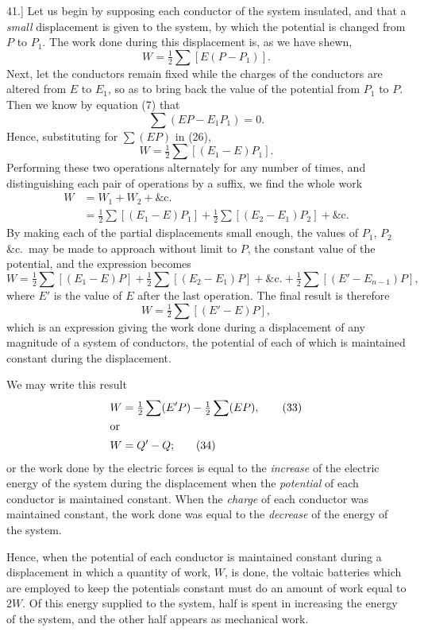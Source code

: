 \documentclass[12pt,oneside]{book}[2021/10/04]
\newcommand{\Runhead}[1]{\fancyhead[C]{\iffloatpage{}{\small#1}}}
\newcommand{\article}[1]{\phantomsection \label{art:#1}{#1.]}}
\newcommand{\¬}{\hphantom{0}}
\begin{document}
\article{41} Let us begin by supposing each conductor of the system
insulated, and that a \textit{small} displacement is given to the system, by
which the potential is changed from \(P\) to \(P_1\). The work done
during this displacement is, as we have shewn,
\[W = \tfrac{1}{2}\sum[E(P - P_1)]. \tag{26}\]
Next, let the conductors remain fixed while the charges of the conductors
are altered from \(E\) to \(E_1\), so as to bring back the value of
the potential from \(P_1\) to \(P\). Then we know by equation (7) that
\[\sum(EP - E_1P_1) = 0. \tag{27}\]
Hence, substituting for \(\sum(EP)\) in (26),
\[W = \tfrac{1}{2}\sum[(E_1 - E)P_1]. \tag{28}\]
Performing these two operations alternately for any number of
times, and distinguishing each pair of operations by a suffix, we
find the whole work
\begin{align}
W &= W_1 + W_2 + \text{\&c.} \tag{29}\\
&= \tfrac{1}{2}\sum[(E_1 - E)P_1] + \tfrac{1}{2}\sum[(E_2 - E_1)P_2] + \text{\&c.} \tag{30}
\end{align}
By making each of the partial displacements small enough, the
values of \(P_1\), \(P_2\) \&c.\ may be made to approach without limit to \(P\),
the constant value of the potential, and the expression becomes
\[W = \tfrac{1}{2}\sum[(E_1 - E)P] + \tfrac{1}{2}\sum[(E_2 - E_1)P] + \text{\&c.} + \tfrac{1}{2}\sum[(E' - E_{n-1})P], \tag{31}\]
where \(E'\) is the value of \(E\) after the last operation. The final result
is therefore
\[W = \tfrac{1}{2}\sum[(E' - E)P], \tag{32}\]
which is an expression giving the work done during a displacement
of any magnitude of a system of conductors, the potential of each of
which is maintained constant during the displacement.
\Runhead{MECHANICAL WORK DURING DISPLACEMENT.}

We may write this result
\begin{align}
W &= \tfrac{1}{2}\sum(E'P) - \tfrac{1}{2}\sum(EP), \tag{33}\\
\shortintertext{or}
W &= Q'- Q\text{;} \tag{34}
\end{align}
or the work done by the electric forces is equal to the \textit{increase} of
the electric energy of the system during the displacement when
the \textit{potential} of each conductor is maintained constant. When the
\textit{charge} of each conductor was maintained constant, the work done
was equal to the \textit{decrease} of the energy of the system.

Hence, when the potential of each conductor is maintained constant
during a displacement in which a quantity of work, \(W\), is
done, the voltaic batteries which are employed to keep the potentials
constant must do an amount of work equal to \(2W\). Of this
energy supplied to the system, half is spent in increasing the
energy of the system, and the other half appears as mechanical
work.
\end{document}
